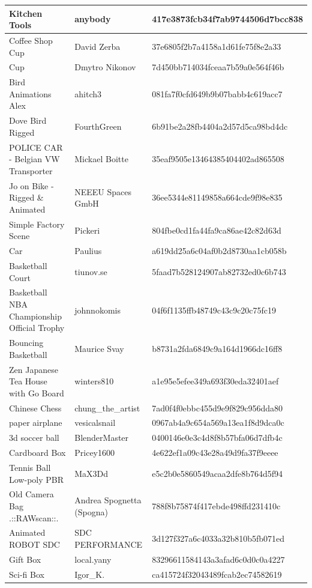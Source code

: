 \begin{longtable}{|p{6cm}|p{4cm}|p{6cm}|}
\hline
Kitchen Tools & anybody & 417e3873fcb34f7ab9744506d7bcc838 \\
\hline
Coffee Shop Cup & David Zerba & 37e6805f2b7a4158a1d61fe75f8e2a33 \\
\hline
Cup & Dmytro Nikonov & 7d450bb714034fceaa7b59a0e564f46b \\
\hline
Bird Animations Alex & ahitch3 & 081fa7f0cfd649b9b07babb4c619acc7 \\
\hline
Dove Bird Rigged & FourthGreen & 6b91be2a28fb4404a2d57d5ca98bd4dc \\
\hline
POLICE CAR - Belgian VW Transporter & Mickael Boitte & 35eaf9505e13464385404402ad865508 \\
\hline
Jo on Bike - Rigged \& Animated & NEEEU Spaces GmbH & 36ee5344e81149858a664cde9f98e835 \\
\hline
Simple Factory Scene & Pickeri & 804fbe0cd1fa44fa9ca86ae42c82d63d \\
\hline
Car & Paulius & a619dd25a6c04af0b2d8730aa1cb058b \\
\hline
Basketball Court & tiunov.se & 5faad7b528124907ab82732ed0c6b743 \\
\hline
Basketball NBA Championship Official Trophy & johnnokomis & 04f6f1135ffb48749c43c9c20c75fc19 \\
\hline
Bouncing Basketball & Maurice Svay & b8731a2fda6849c9a164d1966dc16ff8 \\
\hline
Zen Japanese Tea House with Go Board & winters810 & a1e95e5efee349a693f30eda32401aef \\
\hline
Chinese Chess & chung\_the\_artist & 7ad0f4f0ebbc455d9e9f829c956dda80 \\
\hline
paper airplane & vesicalsnail & 0967ab4a9c654a569a13ea1f8d9dca0c \\
\hline
3d soccer ball & BlenderMaster & 0400146e0e3c4d8f8b57bfa06d7dfb4c \\
\hline
Cardboard Box & Pricey1600 & 4e622ef1a09c43e28a49d9fa37f9eeee \\
\hline
Tennis Ball Low-poly PBR & MaX3Dd & e5c2b0e5860549acaa2dfe8b764d5f94 \\
\hline
Old Camera Bag .::RAWscan::. & Andrea Spognetta (Spogna) & 788f8b75874f417ebde498ffd231410c \\
\hline
Animated ROBOT SDC & SDC PERFORMANCE & 3d127f327a6c4033a32b810b5fb071ed \\
\hline
Gift Box & local.yany & 83296611584143a3afad6c0d0c0a4227 \\
\hline
Sci-fi Box & Igor\_K. & ca415724f32043489fcab2ec74582619 \\

\end{longtable}
